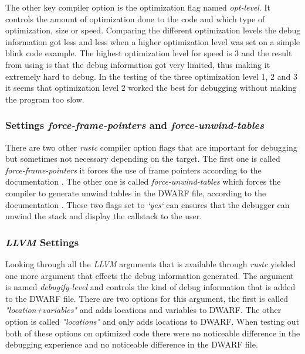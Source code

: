 The other key compiler option is the optimization flag named \emph{opt-level}.
It controls the amount of optimization done to the code and which type of optimization, size or speed.
Comparing the different optimization levels the debug information got less and less when a higher optimization level was set on a simple blink code example.
The highest optimization level for speed is $3$ and the result from using is that the debug information got very limited, thus making it extremely hard to debug.
In the testing of the three optimization level $1$, $2$ and $3$ it seems that optimization level $2$ worked the best for debugging without making the program too slow.


\subsubsection{Settings \emph{force-frame-pointers} and \emph{force-unwind-tables}}
There are two other \emph{rustc} compiler option flags that are important for debugging but sometimes not necessary depending on the target.
The first one is called \emph{force-frame-pointers} it forces the use of frame pointers according to the documentation \cite{rustc-book-codegen}.
The other one is called \emph{force-unwind-tables} which forces the compiler to generate unwind tables in the \gls{DWARF} file, according to the documentation \cite{rustc-book-codegen}.
These two flags set to \emph{`yes`} can ensures that the debugger can unwind the stack and display the callstack to the user.


\subsubsection{\emph{LLVM} Settings}
Looking through all the \emph{LLVM} arguments that is available through \emph{rustc} yielded one more argument that effects the debug information generated.
The argument is named \emph{debugify-level} and controls the kind of debug information that is added to the \gls{DWARF} file.
There are two options for this argument, the first is called \emph{"location+variables"} and adds locations and variables to \gls{DWARF}.
The other option is called \emph{"locations"} and only adds locations to \gls{DWARF}.
When testing out both of these options on optimized code there were no noticeable difference in the debugging experience and no noticeable difference in the  \gls{DWARF} file.


